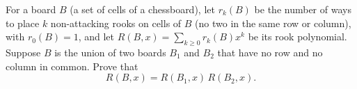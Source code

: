 For a board $B$ (a set of cells of a chessboard), let $r_k(B)$ be the number of ways to place $k$ non-attacking rooks on cells of $B$ (no two in the same row or column), with $r_0(B)=1$, and let $R(B,x)=\sum_{k\ge0}r_k(B)x^k$ be its rook polynomial. Suppose $B$ is the union of two boards $B_1$ and $B_2$ that have no row and no column in common. Prove that
\[
R(B,x)=R(B_1,x)\,R(B_2,x).
\]
